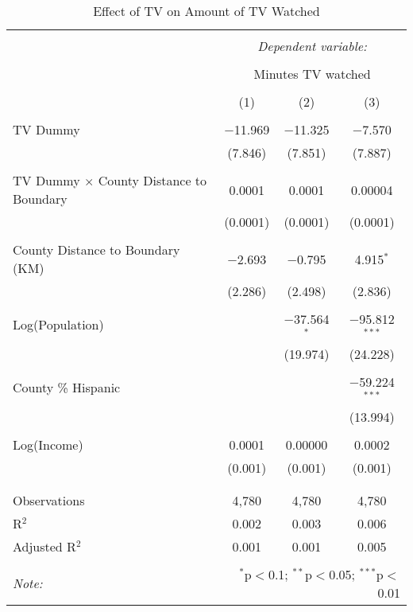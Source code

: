
\begin{table}[!htbp] \centering 
  \caption{Effect of TV on Amount of TV Watched} 
  \label{} 
\begin{tabular}{@{\extracolsep{-5pt}}lccc} 
\\[-1.8ex]\hline 
\hline \\[-1.8ex] 
 & \multicolumn{3}{c}{\textit{Dependent variable:}} \\ 
\cline{2-4} 
\\[-1.8ex] & \multicolumn{3}{c}{Minutes TV watched} \\ 
\\[-1.8ex] & (1) & (2) & (3)\\ 
\hline \\[-1.8ex] 
 TV Dummy & $-$11.969 & $-$11.325 & $-$7.570 \\ 
  & (7.846) & (7.851) & (7.887) \\ 
  & & & \\ 
 TV Dummy $\times$ County Distance to Boundary  & 0.0001 & 0.0001 & 0.00004 \\ 
  & (0.0001) & (0.0001) & (0.0001) \\ 
  & & & \\ 
 County Distance to Boundary (KM) & $-$2.693 & $-$0.795 & 4.915$^{*}$ \\ 
  & (2.286) & (2.498) & (2.836) \\ 
  & & & \\ 
 Log(Population) &  & $-$37.564$^{*}$ & $-$95.812$^{***}$ \\ 
  &  & (19.974) & (24.228) \\ 
  & & & \\ 
 County \% Hispanic &  &  & $-$59.224$^{***}$ \\ 
  &  &  & (13.994) \\ 
  & & & \\ 
 Log(Income) & 0.0001 & 0.00000 & 0.0002 \\ 
  & (0.001) & (0.001) & (0.001) \\ 
  & & & \\ 
\hline \\[-1.8ex] 
Observations & 4,780 & 4,780 & 4,780 \\ 
R$^{2}$ & 0.002 & 0.003 & 0.006 \\ 
Adjusted R$^{2}$ & 0.001 & 0.001 & 0.005 \\ 
\hline 
\hline \\[-1.8ex] 
\textit{Note:}  & \multicolumn{3}{r}{$^{*}$p$<$0.1; $^{**}$p$<$0.05; $^{***}$p$<$0.01} \\ 
\end{tabular} 
\end{table} 
